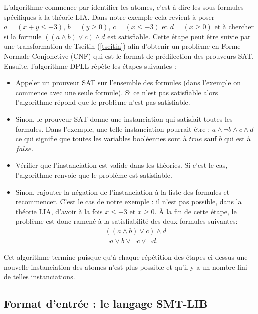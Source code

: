 \documentclass[11pt]{article}
\begin{document}
L'algorithme commence par identifier les atomes, c'est-à-dire les sous-formules spécifiques à la théorie LIA. Dans notre exemple cela revient à poser $a = (x + y \leq -3)$, $b = (y \geq 0)$, $c = (x \leq -3)$ et $d = (x \geq 0)$ et à chercher si la formule  $((a \wedge b) \vee c) \wedge d$ est satisfiable. Cette étape peut être suivie par une transformation de Tseitin (\ref{tseitin}) afin d'obtenir un problème en Forme Normale Conjonctive (CNF) qui est le format de prédilection des prouveurs SAT. \\

Ensuite, l'algorithme DPLL répète les étapes suivantes :
\begin{itemize}
\item Appeler un prouveur SAT sur l'ensemble des formules (dans l'exemple on commence avec une seule formule). Si ce n'est pas satisfiable alors l'algorithme répond que le problème n'est pas satisfiable.
\item Sinon, le prouveur SAT donne une instanciation qui satisfait toutes les formules. Dans l'exemple, une telle instanciation pourrait être :
  $a \wedge \neg b \wedge c \wedge d$
ce qui signifie que toutes les variables booléennes sont à $true$ sauf $b$ qui est à $false$.
\item Vérifier que l'instanciation est valide dans les théories. Si c'est le cas, l'algorithme renvoie que le problème est satisfiable.
\item Sinon, rajouter la négation de l'instanciation à la liste des formules et recommencer. C'est le cas de notre exemple : il n'est pas possible, dans la théorie LIA, d'avoir à la fois $x \leq -3$ et $x \geq 0$. À la fin de cette étape, le problème est donc ramené à la satisfiabilité des deux formules suivantes:
  \begin{align*}
    ((a \wedge b) \vee c) \wedge d \\
    \neg a \vee b \vee \neg c \vee \neg d.
  \end{align*}
\end{itemize}

Cet algorithme termine puisque qu'à chaque répétition des étapes ci-dessus une nouvelle instanciation des atomes n'est plus possible et qu'il y a un nombre fini de telles instanciations. 

\subsection{Format d'entrée : le langage SMT-LIB} \label{smt-lib}
\end{document}
